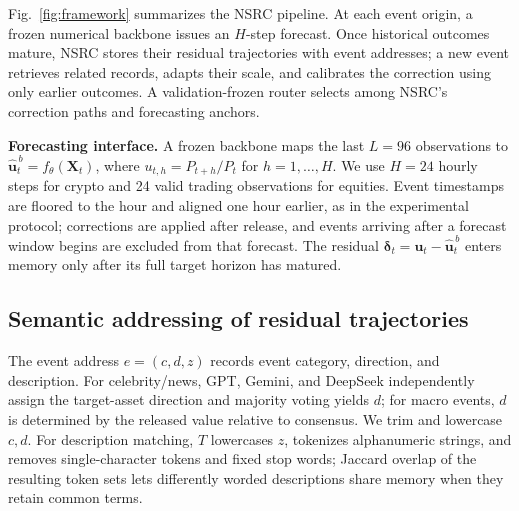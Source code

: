 \documentclass{article}
\begin{document}
Fig.~\ref{fig:framework} summarizes the NSRC pipeline. At each event origin, a frozen numerical backbone issues an $H$-step forecast. Once historical outcomes mature, NSRC stores their residual trajectories with event addresses; a new event retrieves related records, adapts their scale, and calibrates the correction using only earlier outcomes. A validation-frozen router selects among NSRC's correction paths and forecasting anchors.

\textbf{Forecasting interface.} A frozen backbone maps the last $L=96$ observations to $\hat{\mathbf u}^{\,b}_t=f_\theta(\mathbf X_t)$, where $u_{t,h}=P_{t+h}/P_t$ for $h=1,\ldots,H$. We use $H=24$ hourly steps for crypto and 24 valid trading observations for equities. Event timestamps are floored to the hour and aligned one hour earlier, as in the experimental protocol; corrections are applied after release, and events arriving after a forecast window begins are excluded from that forecast. The residual $\boldsymbol\delta_t=\mathbf u_t-\hat{\mathbf u}^{\,b}_t$ enters memory only after its full target horizon has matured.

\subsection{Semantic addressing of residual trajectories}
The event address $e=(c,d,z)$ records event category, direction, and description. For celebrity/news, GPT, Gemini, and DeepSeek independently assign the target-asset direction and majority voting yields $d$; for macro events, $d$ is determined by the released value relative to consensus. We trim and lowercase $c,d$. For description matching, $T$ lowercases $z$, tokenizes alphanumeric strings, and removes single-character tokens and fixed stop words; Jaccard overlap of the resulting token sets lets differently worded descriptions share memory when they retain common terms.
\end{document}
